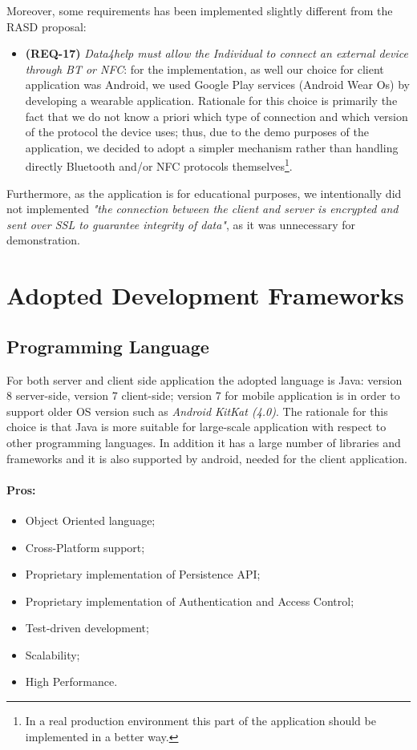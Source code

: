 \documentclass[a4paper]{article}
\begin{document}
Moreover, some requirements has been implemented slightly different from the RASD proposal:
\begin{itemize}
    \item \textbf{(REQ-17)} \textit{Data4help must allow the Individual to connect an external device through BT or NFC}: for the implementation, as well our choice for client application was Android, we used Google Play services (Android Wear Os) by developing a wearable application. Rationale for this choice is primarily the fact that we do not know a priori which type of connection and which version of the protocol the device uses; thus, due to the demo purposes of the application, we decided to adopt a simpler mechanism rather than handling directly Bluetooth and/or NFC protocols themselves\footnote{In a real production environment this part of the application should be implemented in a better way.}.
\end{itemize}

Furthermore, as the application is for educational purposes, we intentionally did not implemented \textit{"the connection between the client and server is encrypted and sent over SSL to guarantee integrity of data"}, as it was unnecessary for demonstration.


\newpage
\section{Adopted Development Frameworks}

\subsection{Programming Language}
For both server and client side application the adopted language is Java: version 8 server-side, version 7 client-side; version 7 for mobile application is in order to support older OS version such as \textit{Android KitKat (4.0)}. The rationale for this choice is that Java is more suitable for large-scale application with respect to other programming languages. In addition it has a large number of libraries and frameworks and it is also supported by android, needed for the client application.

\paragraph{Pros:}

\begin{itemize}
    \item Object Oriented language;
    \item Cross-Platform support;
    \item Proprietary implementation of Persistence API;
    \item Proprietary implementation of Authentication and Access Control;
    \item Test-driven development;
    \item Scalability;
    \item High Performance.
\end{itemize}
\end{document}
